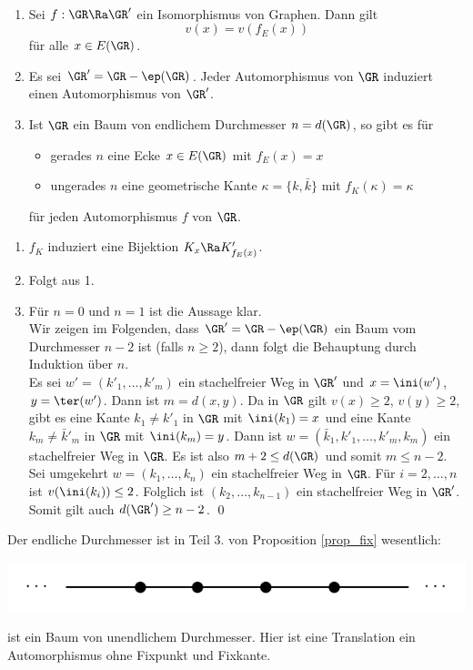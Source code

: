 \PROP\
\label{prop_fix}
\begin{enumerate}
\item Sei $f:\GR\Ra\GR'$ ein Isomorphismus von Graphen.
Dann gilt
\[
v(x) = v(f_E(x))
\]
für alle $x\in E(\GR)$.
\item Es sei $\GR'=\GR-\ep(\GR)$. Jeder Automorphismus von $\GR$
induziert einen Automorphismus von $\GR'$.
\item Ist $\GR$ ein Baum von endlichem Durchmesser $n=d(\GR)$,
so gibt es für
	\begin{itemize}
	\item gerades $n$ eine Ecke $x\in E(\GR)$ mit $f_E(x)=x$
	\item ungerades $n$ eine geometrische Kante $\kappa=\{k,\bar{k}\}$
	mit $f_K(\kappa)=\kappa$
	\end{itemize}
für jeden Automorphismus $f$ von $\GR$.
\end{enumerate}
\bew 
\begin{enumerate}
\item $f_K$ induziert eine Bijektion $K_x\Ra K'_{f_E(x)}$.
\item Folgt aus 1.
\item Für $n=0$ und $n=1$ ist die Aussage klar.\\
Wir zeigen im Folgenden, dass $\GR'=\GR-\ep(\GR)$ ein Baum vom
Durchmesser $n-2$ ist (falls $n\geq 2$), dann folgt die
Behauptung durch Induktion über $n$.\\
Es sei $w'=(k'_1,\ldots,k'_m)$ ein stachelfreier Weg in $\GR'$
und $x=\ini(w')$, $y=\ter(w')$. Dann ist $m=d(x,y)$.
Da in $\GR$ gilt $v(x)\geq 2$, $v(y)\geq 2$, gibt es eine Kante
$k_1\neq k'_1$ in $\GR$ mit $\ini(k_1)=x$ und eine Kante
$k_m\neq \bar{k}'_m$ in $\GR$ mit $\ini(k_m)=y$.
Dann ist $w=(\bar{k}_1,k'_1,\ldots,k'_m,k_m)$ ein stachelfreier Weg
in $\GR$. Es ist also $m+2\leq d(\GR)$ und somit $m\leq n-2$.\\
Sei umgekehrt $w=(k_1,\ldots,k_n)$ ein stachelfreier Weg in $\GR$.
Für $i=2,\ldots,n$ ist $v(\ini(k_i))\leq 2$. Folglich ist
$(k_2,\ldots,k_{n-1})$ ein stachelfreier Weg in $\GR'$.
Somit gilt auch $d(\GR')\geq n-2$.
\qed
\end{enumerate}

\BSP Der endliche Durchmesser ist in Teil 3. von Proposition
\ref{prop_fix} wesentlich:
\begin{center}
	\includegraphics{grugraImages/unendldiam}
\end{center}
ist ein Baum von unendlichem Durchmesser. Hier ist eine Translation
ein Automorphismus ohne Fixpunkt und Fixkante.

